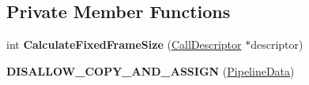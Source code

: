 \subsection*{Private Member Functions}
\begin{DoxyCompactItemize}
\item 
int {\bfseries Calculate\+Fixed\+Frame\+Size} (\hyperlink{classv8_1_1internal_1_1compiler_1_1_call_descriptor}{Call\+Descriptor} $\ast$descriptor)\hypertarget{classv8_1_1internal_1_1compiler_1_1_pipeline_data_a618f76f8be2ec745e5f88788b01d77e3}{}\label{classv8_1_1internal_1_1compiler_1_1_pipeline_data_a618f76f8be2ec745e5f88788b01d77e3}

\item 
{\bfseries D\+I\+S\+A\+L\+L\+O\+W\+\_\+\+C\+O\+P\+Y\+\_\+\+A\+N\+D\+\_\+\+A\+S\+S\+I\+GN} (\hyperlink{classv8_1_1internal_1_1compiler_1_1_pipeline_data}{Pipeline\+Data})\hypertarget{classv8_1_1internal_1_1compiler_1_1_pipeline_data_a0f9060fb609089c5f66016a82d112b2b}{}\label{classv8_1_1internal_1_1compiler_1_1_pipeline_data_a0f9060fb609089c5f66016a82d112b2b}

\end{DoxyCompactItemize}
